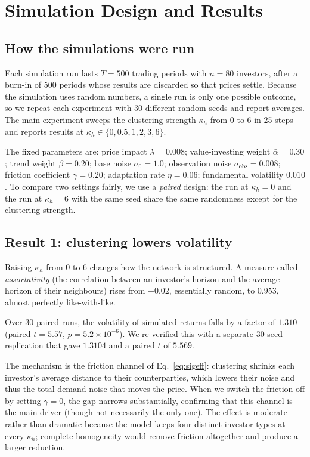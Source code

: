 \section{Simulation Design and Results}
\label{sec:simulation}

\subsection{How the simulations were run}

Each simulation run lasts $T=500$ trading periods with $n=80$ investors, after a burn-in of 500 periods whose results are discarded so that prices settle. Because the simulation uses random numbers, a single run is only one possible outcome, so we repeat each experiment with 30 different random seeds and report averages. The main experiment sweeps the clustering strength $\kappa_h$ from 0 to 6 in 25 steps and reports results at $\kappa_h\in\{0,0.5,1,2,3,6\}$.

The fixed parameters are: price impact $\lambda=0.008$; value-investing weight $\bar\alpha=0.30$; trend weight $\bar\beta=0.20$; base noise $\sigma_0=1.0$; observation noise $\sigma_{\mathrm{obs}}=0.008$; friction coefficient $\gamma=0.20$; adaptation rate $\eta=0.06$; fundamental volatility $0.010$. To compare two settings fairly, we use a \emph{paired} design: the run at $\kappa_h=0$ and the run at $\kappa_h=6$ with the same seed share the same randomness except for the clustering strength.

\subsection{Result 1: clustering lowers volatility}
\label{sec:res1}

Raising $\kappa_h$ from 0 to 6 changes how the network is structured. A measure called \emph{assortativity} (the correlation between an investor's horizon and the average horizon of their neighbours) rises from $-0.02$, essentially random, to $0.953$, almost perfectly like-with-like.

Over 30 paired runs, the volatility of simulated returns falls by a factor of $1.310$ (paired $t=5.57$, $p=5.2\times10^{-6}$). We re-verified this with a separate 30-seed replication that gave $1.3104$ and a paired $t$ of $5.569$.

The mechanism is the friction channel of Eq.~\eqref{eq:sigeff}: clustering shrinks each investor's average distance to their counterparties, which lowers their noise and thus the total demand noise that moves the price. When we switch the friction off by setting $\gamma=0$, the gap narrows substantially, confirming that this channel is the main driver (though not necessarily the only one). The effect is moderate rather than dramatic because the model keeps four distinct investor types at every $\kappa_h$; complete homogeneity would remove friction altogether and produce a larger reduction.

